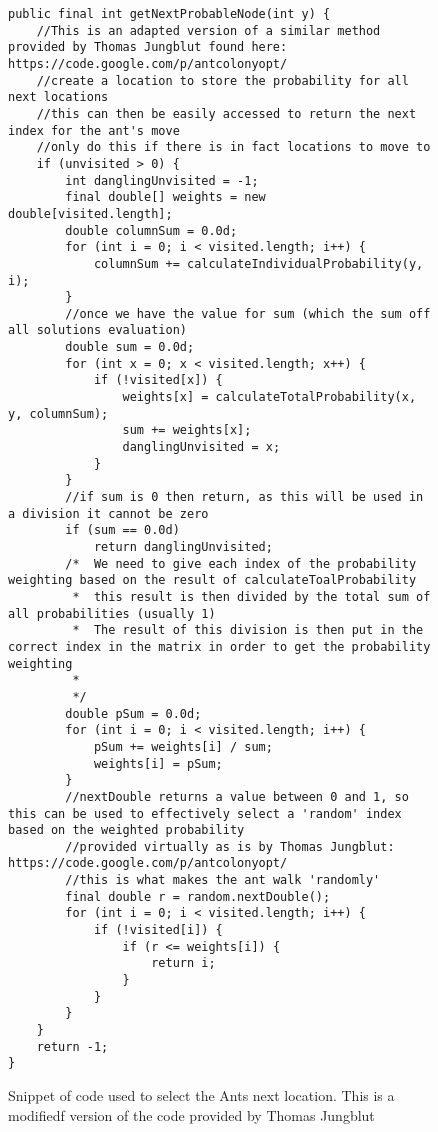 \begin{figure}[H]
\begin{lstlisting}
public final int getNextProbableNode(int y) {
	//This is an adapted version of a similar method provided by Thomas Jungblut found here: https://code.google.com/p/antcolonyopt/
	//create a location to store the probability for all next locations
	//this can then be easily accessed to return the next index for the ant's move
	//only do this if there is in fact locations to move to
	if (unvisited > 0) {
		int danglingUnvisited = -1;
		final double[] weights = new double[visited.length];
		double columnSum = 0.0d;
		for (int i = 0; i < visited.length; i++) {
			columnSum += calculateIndividualProbability(y, i);
		}
		//once we have the value for sum (which the sum off all solutions evaluation)
		double sum = 0.0d;
		for (int x = 0; x < visited.length; x++) {
			if (!visited[x]) {
				weights[x] = calculateTotalProbability(x, y, columnSum);
				sum += weights[x];
				danglingUnvisited = x;
			}
		}
		//if sum is 0 then return, as this will be used in a division it cannot be zero
		if (sum == 0.0d)
			return danglingUnvisited;
		/*  We need to give each index of the probability weighting based on the result of calculateToalProbability
		 *  this result is then divided by the total sum of all probabilities (usually 1)
		 *  The result of this division is then put in the correct index in the matrix in order to get the probability weighting
		 *
		 */
		double pSum = 0.0d;
		for (int i = 0; i < visited.length; i++) {
			pSum += weights[i] / sum;
			weights[i] = pSum;
		}
		//nextDouble returns a value between 0 and 1, so this can be used to effectively select a 'random' index based on the weighted probability
		//provided virtually as is by Thomas Jungblut: https://code.google.com/p/antcolonyopt/
		//this is what makes the ant walk 'randomly'
		final double r = random.nextDouble();
		for (int i = 0; i < visited.length; i++) {
			if (!visited[i]) {
				if (r <= weights[i]) {
					return i;
				}
			}
		}
	}
	return -1;
}
\end{lstlisting}
\caption{Snippet of code used to select the Ants next location. This is a modifiedf version of the code provided by Thomas Jungblut \cite{tjung:aco:blog}}
\label{nextNodeCode}
\end{figure}

